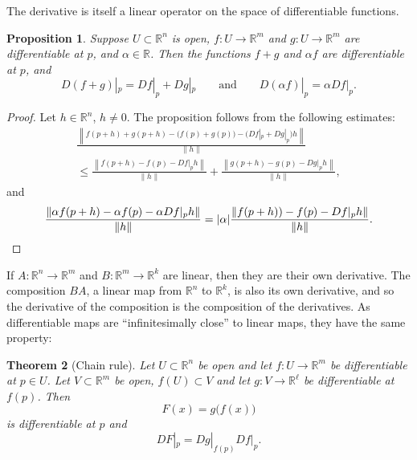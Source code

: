 \documentclass[12pt,openany]{book}
\newcommand{\sabs}[1]{\lvert {#1} \rvert}
\newcommand{\snorm}[1]{\lVert {#1} \rVert}
\newcommand{\norm}[1]{\left\lVert {#1} \right\rVert}
\newcommand{\R}{{\mathbb{R}}}
\newcommand{\myquote}[1]{``#1''}
\theoremstyle{plain}
\newtheorem{thm}{Theorem}[section]
\newtheorem{prop}[thm]{Proposition}
\theoremstyle{remark}
\theoremstyle{definition}
\theoremstyle{exercise}
\theoremstyle{example}
\begin{document}
The derivative is itself a linear operator on the space of differentiable
functions.

\begin{prop}
Suppose $U \subset \R^n$ is open,
$f \colon U \to \R^m$ and
$g \colon U \to \R^m$ are differentiable at $p$,
and $\alpha \in \R$.  Then the functions $f+g$ and $\alpha f$
are differentiable at $p$, and
\begin{equation*}
D(f+g)|_p = Df|_p + Dg|_p \qquad \text{and} \qquad D(\alpha f)|_p = \alpha
Df|_p .
\end{equation*}
\end{prop}

\begin{proof}
Let $h \in \R^n$, $h \not= 0$.  The proposition follows from the following
estimates:
\begin{multline*}
\frac{\norm{f(p+h)+g(p+h)-\bigl(f(p)+g(p)\bigr) - \bigl(Df|_p + Dg|_p\bigr)h}}{\snorm{h}}
\\
\leq
\frac{\norm{f(p+h)-f(p) - Df|_ph}}{\snorm{h}}
+
\frac{\norm{g(p+h)-g(p) - Dg|_ph}}{\snorm{h}} ,
\end{multline*}
and
\begin{equation*}
\frac{\norm{\alpha f(p+h) - \alpha f(p) - \alpha Df|_p h}}{\snorm{h}}
=
\sabs{\alpha} \frac{\norm{f(p+h))-f(p) - Df|_ph}}{\snorm{h}} .
\qedhere
\end{equation*}
\end{proof}

If $A \colon \R^n \to \R^m$ and $B \colon \R^m \to \R^k$ are linear, then 
they are their own derivative.  The composition
$BA$, a linear map from $\R^n$ to $\R^k$, is also its own derivative, and
so the derivative of the composition is the composition
of the derivatives.
As differentiable maps are \myquote{infinitesimally close}
to linear maps, they have the same property:

\begin{thm}[Chain rule] \label{thm:realchain}
Let $U \subset \R^n$ be open and let $f \colon U \to \R^m$ be
differentiable at $p \in U$.  Let $V \subset \R^m$ be open,
$f(U) \subset V$ and let $g \colon V \to \R^\ell$ be differentiable
at $f(p)$.  Then
\begin{equation*}
F(x) = g\bigl(f(x)\bigr)
\end{equation*}
is differentiable at $p$ and
\begin{equation*}
DF|_p = Dg|_{f(p)} Df|_p .
\end{equation*}
\end{thm}
\end{document}
